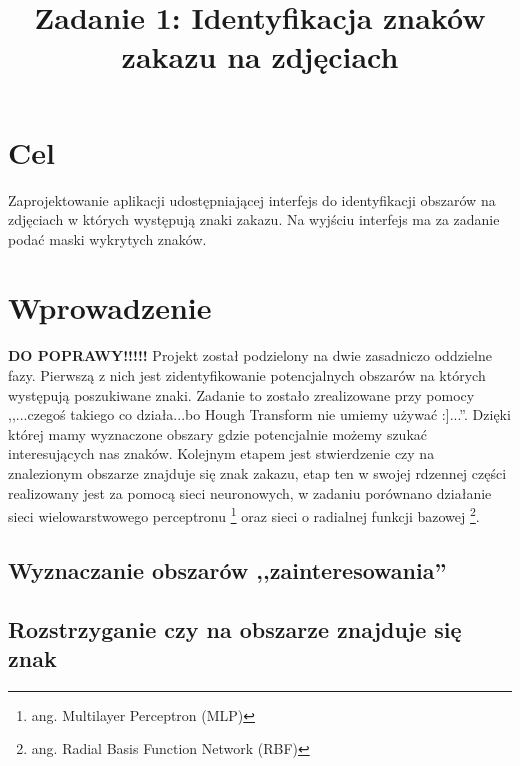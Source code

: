 \documentclass{classrep}
\author{
  \studentinfo{Paweł Musiał}{178726} \and
  \studentinfo{Łukasz Michalski}{178724}
}
\title{Zadanie 1: Identyfikacja znaków zakazu na zdjęciach}
\begin{document}
\maketitle



\section{Cel}
Zaprojektowanie aplikacji udostępniającej interfejs do identyfikacji obszarów na zdjęciach w których występują znaki zakazu. Na wyjściu interfejs ma za zadanie podać maski wykrytych znaków.

\section{Wprowadzenie}
\textbf{DO POPRAWY!!!!!}
Projekt został podzielony na dwie zasadniczo oddzielne fazy. Pierwszą z nich jest zidentyfikowanie potencjalnych obszarów na których występują poszukiwane znaki. Zadanie to zostało zrealizowane przy pomocy ,,...czegoś takiego co działa...bo Hough Transform nie umiemy używać :]...''. Dzięki której mamy wyznaczone obszary gdzie potencjalnie możemy szukać interesujących nas znaków. Kolejnym etapem jest stwierdzenie czy na znalezionym obszarze znajduje się znak zakazu, etap ten w swojej rdzennej części realizowany jest za pomocą sieci neuronowych, w zadaniu porównano działanie sieci wielowarstwowego perceptronu \footnote{ang. Multilayer Perceptron (MLP)} oraz sieci o radialnej funkcji bazowej \footnote{ang. Radial Basis Function Network (RBF)}.

\subsection{Wyznaczanie obszarów ,,zainteresowania''}

\subsection{Rozstrzyganie czy na obszarze znajduje się znak}
\end{document}
